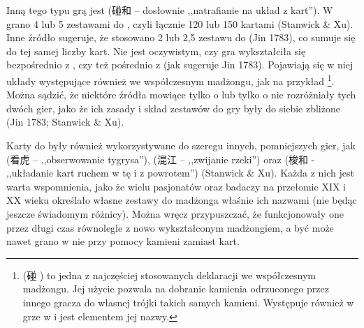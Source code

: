 Inną tego typu grą jest  (碰和  -- dosłownie
,,natrafianie na układ z kart'').
W  grano 4 lub 5 zestawami do , czyli łącznie 120
lub 150 kartami (Stanwick \& Xu). Inne źródło sugeruje, że stosowano 2 lub 2,5
zestawu do  (Jin 1783), co sumuje się do tej samej liczby kart.
Nie jest oczywistym, czy gra wykształciła się bezpośrednio z ,
czy też pośrednio z  (jak sugeruje Jin 1783).
Pojawiają się w niej układy występujące również we współczesnym madżongu, jak na
przykład \footnote{ (碰 ) to jedna z
 najczęściej stosowanych deklaracji we współczesnym madżongu. Jej użycie pozwala
 na dobranie kamienia odrzuconego przez innego gracza do własnej trójki takich
 samych kamieni. Występuje również w grze w  i jest elementem jej
 nazwy.}. Można sądzić, że niektóre źródła mowiące tylko o  lub
 tylko o  nie rozróżniały tych dwóch gier, jako że ich zasady i
 skład zestawów do gry były do siebie zbliżone (Jin 1783; Stanwick \& Xu).

Karty do  były również wykorzystywane do szeregu innych,
pomniejszych gier, jak  (看虎  \label{kanhu}--
,,obserwowanie tygrysa''),  (混江  -- ,,zwijanie rzeki'') oraz
 (梭和  - ,,układanie kart ruchem w tę i z
powrotem'') (Stanwick \& Xu). Każda z nich jest warta wspomnienia, jako że wielu
pasjonatów oraz badaczy na przełomie XIX i XX wieku określało własne zestawy do
madżonga właśnie ich nazwami (nie będąc jeszcze świadomym różnicy).
Można wręcz przypuszczać, że funkcjonowały one przez długi czas równolegle z
nowo wykształconym madżongiem, a być może nawet grano w nie przy pomocy
kamieni zamiast kart.
